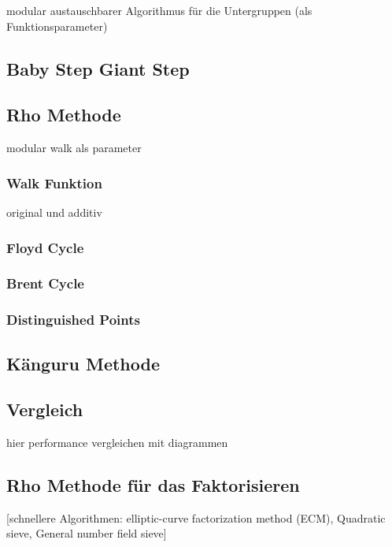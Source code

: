 \documentclass{scrartcl}
\begin{document}
modular austauschbarer Algorithmus für die Untergruppen
(als Funktionsparameter)

\cite{Pohlig1978}

\subsection{Baby Step Giant Step}
\label{sec:baby_step_giant_step}

\cite{Galbraith2012}

\subsection{Rho Methode}
\label{sec:rho}

modular walk als parameter

\cite{Galbraith2012}

\subsubsection{Walk Funktion}
\label{sec:walk_funktion}
original und additiv

\subsubsection{Floyd Cycle}
\label{sec:floyd_cycle}


\subsubsection{Brent Cycle}
\label{sec:brent_cycle}

\cite{Brent1980}

\subsubsection{Distinguished Points}
\label{sec:distinguished_points}


\cite{VanOorschot1999}

\subsection{Känguru Methode}
\label{sec:kaenguru}

\subsection{Vergleich}

hier performance vergleichen mit diagrammen

\subsection{Rho Methode für das Faktorisieren}
\label{sec:rho_faktorisieren}

[schnellere Algorithmen: elliptic-curve factorization method (ECM), Quadratic sieve, General number field sieve]

\cite{Pollard1975}

\newpage
\printbibliography[heading=bibintoc]
\end{document}
